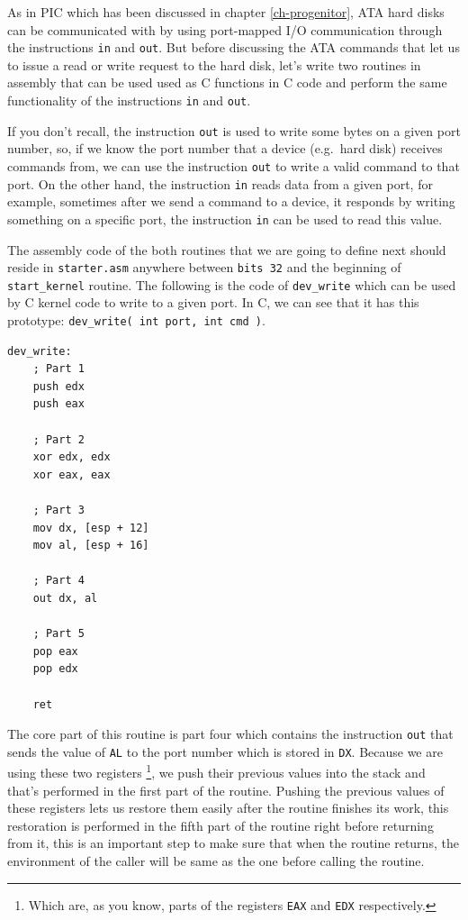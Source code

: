 As in PIC which has been discussed in chapter \ref{ch-progenitor}, ATA
hard disks can be communicated with by using port-mapped I/O
communication through the instructions \lstinline!in! and
\lstinline!out!. But before discussing the ATA commands that let us to
issue a read or write request to the hard disk, let's write two routines
in assembly that can be used used as C functions in C code and perform
the same functionality of the instructions \lstinline!in! and
\lstinline!out!.

If you don't recall, the instruction \lstinline!out! is used to write
some bytes on a given port number, so, if we know the port number that a
device (e.g.~hard disk) receives commands from, we can use the
instruction \lstinline!out! to write a valid command to that port. On
the other hand, the instruction \lstinline!in! reads data from a given
port, for example, sometimes after we send a command to a device, it
responds by writing something on a specific port, the instruction
\lstinline!in! can be used to read this value.

The assembly code of the both routines that we are going to define next
should reside in \lstinline!starter.asm! anywhere between
\lstinline!bits 32! and the beginning of \lstinline!start_kernel!
routine. The following is the code of \lstinline!dev_write! which can be
used by C kernel code to write to a given port. In C, we can see that it
has this prototype: \lstinline!dev_write( int port, int cmd )!.

\begin{lstlisting}
dev_write:
    ; Part 1
    push edx
    push eax
    
    ; Part 2
    xor edx, edx
    xor eax, eax
    
    ; Part 3
    mov dx, [esp + 12]
    mov al, [esp + 16]
    
    ; Part 4
    out dx, al 
    
    ; Part 5
    pop eax
    pop edx
    
    ret
\end{lstlisting}

The core part of this routine is part four which contains the
instruction \lstinline!out! that sends the value of \lstinline!AL! to
the port number which is stored in \lstinline!DX!. Because we are using
these two registers \footnote{Which are, as you know, parts of the
  registers \lstinline!EAX! and \lstinline!EDX! respectively.}, we push
their previous values into the stack and that's performed in the first
part of the routine. Pushing the previous values of these registers lets
us restore them easily after the routine finishes its work, this
restoration is performed in the fifth part of the routine right before
returning from it, this is an important step to make sure that when the
routine returns, the environment of the caller will be same as the one
before calling the routine.


